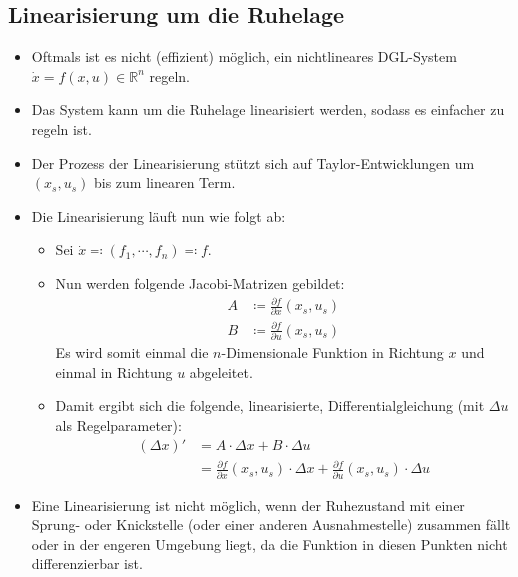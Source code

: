 		\subsection{Linearisierung um die Ruhelage} %
			\label{sec:linearisierung}

			\begin{itemize}
				\item Oftmals ist es nicht (effizient) möglich, ein nichtlineares DGL-System \( \dot{x} = f(x, u) \in \mathbb{R} ^ n \) regeln.
				\item Das System kann um die Ruhelage linearisiert werden, sodass es einfacher zu regeln ist.
				\item Der Prozess der Linearisierung stützt sich auf Taylor-Entwicklungen um \( (x _ s, u _ s) \) bis zum linearen Term.
				\item Die Linearisierung läuft nun wie folgt ab:
					\begin{itemize}
						\item Sei \( \dot{x} \eqqcolon (f _ 1, \cdots, f _ n) \eqqcolon f \).
						\item Nun werden folgende Jacobi-Matrizen gebildet:
							\begin{align*}
								A & \coloneqq \frac{\partial f}{\partial x} (x _ s, u _ s) \\
								B & \coloneqq \frac{\partial f}{\partial u} (x _ s, u _ s)
							\end{align*}
							Es wird somit einmal die \(n\)-Dimensionale Funktion in Richtung \(x\) und einmal in Richtung \(u\) abgeleitet.
						\item Damit ergibt sich die folgende, linearisierte, Differentialgleichung (mit \( \Delta u \) als Regelparameter):
							\begin{align*}
								{(\Delta x)}' & = A \cdot \Delta x + B \cdot \Delta u                                                                                       \\
								              & = \frac{\partial f}{\partial x} (x _ s, u _ s) \cdot \Delta x + \frac{\partial f}{\partial u} (x _ s, u _ s) \cdot \Delta u
							\end{align*}
					\end{itemize}
				\item Eine Linearisierung ist nicht möglich, wenn der Ruhezustand mit einer Sprung- oder Knickstelle (oder einer anderen Ausnahmestelle) zusammen fällt oder in der engeren Umgebung liegt, da die Funktion in diesen Punkten nicht differenzierbar ist.
			\end{itemize}

